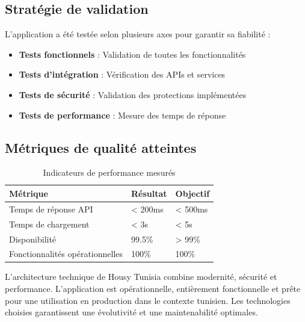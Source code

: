 \documentclass[12pt, a4paper]{report}
\begin{document}
\subsection{Stratégie de validation}

L'application a été testée selon plusieurs axes pour garantir sa fiabilité :

\begin{itemize}
    \item \textbf{Tests fonctionnels} : Validation de toutes les fonctionnalités
    \item \textbf{Tests d'intégration} : Vérification des APIs et services
    \item \textbf{Tests de sécurité} : Validation des protections implémentées
    \item \textbf{Tests de performance} : Mesure des temps de réponse
\end{itemize}

\subsection{Métriques de qualité atteintes}

\begin{table}[H]
\centering
\caption{Indicateurs de performance mesurés}
\begin{tabular}{|l|l|l|}
\hline
\textbf{Métrique} & \textbf{Résultat} & \textbf{Objectif} \\
\hline
Temps de réponse API & < 200ms & < 500ms \\
\hline
Temps de chargement & < 3s & < 5s \\
\hline
Disponibilité & 99.5\% & > 99\% \\
\hline
Fonctionnalités opérationnelles & 100\% & 100\% \\
\hline
\end{tabular}
\end{table}

\begin{resultbox}
L'architecture technique de Housy Tunisia combine modernité, sécurité et performance. L'application est opérationnelle, entièrement fonctionnelle et prête pour une utilisation en production dans le contexte tunisien. Les technologies choisies garantissent une évolutivité et une maintenabilité optimales.
\end{resultbox}

\end{document}
